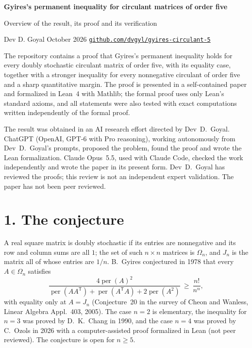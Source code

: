 \documentclass[11pt,a4paper]{article}
\newcommand{\per}{\operatorname{per}}
\newcommand{\T}{\mathsf{T}}
\begin{document}
\thispagestyle{firstpage}
{\LARGE\bfseries Gyires's permanent inequality for circulant matrices of order five\par}
\vspace{4pt}
{\large Overview of the result, its proof and its verification\par}
\vspace{6pt}
Dev D. Goyal \enspace\textperiodcentered\enspace October 2026 \enspace\textperiodcentered\enspace
\href{https://github.com/dvgyl/gyires-circulant-5}{\texttt{github.com/dvgyl/gyires-circulant-5}}
\par\bigskip
The repository contains a proof that Gyires's permanent inequality holds for every doubly stochastic circulant matrix
of order five, with its equality case, together with a stronger inequality for every nonnegative circulant of order
five and a sharp quantitative margin. The proof is presented in a self-contained paper and formalized in Lean~4 with
Mathlib; the formal proof uses only Lean's standard axioms, and all statements were also tested with exact computations
written independently of the formal proof.

The result was obtained in an AI research effort directed by Dev~D.~Goyal. ChatGPT (OpenAI, GPT-6 with Pro
reasoning), working autonomously from Dev~D.~Goyal's prompts, proposed the problem, found the proof and wrote the Lean
formalization. Claude Opus~5.5, used with Claude Code, checked the work independently and wrote the paper in its
present form. Dev~D.~Goyal has reviewed the proofs; this review is not an independent expert validation. The paper has
not been peer reviewed.

\section*{1. The conjecture}
A real square matrix is doubly stochastic if its entries are nonnegative and its row and column sums are all $1$; the
set of such $n\times n$ matrices is $\Omega_n$, and $J_n$ is the matrix all of whose entries are $1/n$. B.~Gyires
conjectured in 1978 that every $A\in\Omega_n$ satisfies
\[
\frac{4\per(A)^2}{\per(AA^\T)+\per(A^\T A)+2\per(A^2)}\ \ge\ \frac{n!}{n^n},
\]
with equality only at $A=J_n$ (Conjecture~20 in the survey of Cheon and Wanless, Linear Algebra Appl.\ 403, 2005). The
case $n=2$ is elementary, the inequality for $n=3$ was proved by D.~K.~Chang in 1990, and the case $n=4$ was proved by
C.~Ozols in 2026 with a computer-assisted proof formalized in Lean (not peer reviewed). The conjecture is open for
$n\ge5$.
\end{document}
